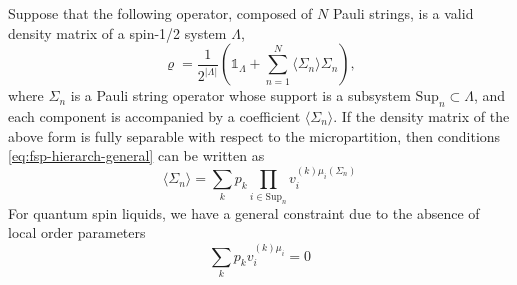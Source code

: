 \documentclass[12font]{article}
\numberwithin{equation}{section}    %
\theoremstyle{definition}
\newcommand{\anglelr}[1]{\langle #1 \rangle}
\newcommand{\lr}[1]{\left(  #1  \right)}
\newcommand{\abs}[1]{\left|  #1  \right|}
\newcommand{\mrm}[1]{\mathrm{#1}}
\begin{document}
Suppose that the following operator, composed of $N$ Pauli strings, is a valid density matrix of a spin-1/2 system $\Lambda$, 
\begin{equation}\label{eq:string-expansion}
    \varrho 
    = 
    \frac{1}{2^{\abs{\Lambda}}}
    \lr{
    \mathds{1}_\Lambda
    +
    \sum_{n=1}^{N}\anglelr{\Sigma_n}\Sigma_{n}
    },
\end{equation}
where $\Sigma_{n}$ is a Pauli string operator whose support is a subsystem $\mrm{Sup}_n\subset\Lambda$, and each component is accompanied by a coefficient $\anglelr{\Sigma_n}$. If the density matrix of the above form is fully separable with respect to the micropartition, then conditions \eqref{eq:fsp-hierarch-general} can be written as
\[
\anglelr{\Sigma_n} = \sum_{k} p_k \prod_{i\in \mrm{Sup}_n} v_i^{(k)\mu_i(\Sigma_n)}
\]
For quantum spin liquids, we have a general constraint due to the absence of local order parameters
\[
\sum_{k} p_k v^{(k)\mu_i}_i = 0
\]
\end{document}
